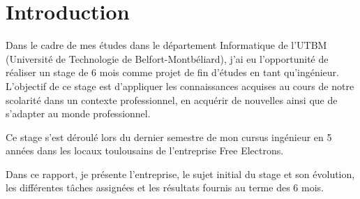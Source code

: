 \chapter{Introduction}

Dans le cadre de mes études dans le département Informatique de l'UTBM (Université de Technologie de Belfort-Montbéliard), j'ai eu l'opportunité de réaliser un stage de 6 mois comme projet de fin d'études en tant qu'ingénieur. L'objectif de ce stage est d'appliquer les connaissances acquises au cours de notre scolarité dans un contexte professionnel, en acquérir de nouvelles ainsi que de s'adapter au monde professionnel.

Ce stage s'est déroulé lors du dernier semestre de mon cursus ingénieur en 5 années dans les locaux toulousains de l'entreprise Free Electrons.

Dans ce rapport, je présente l'entreprise, le sujet initial du stage et son évolution, les différentes tâches assignées et les résultats fournis au terme des 6 mois.
